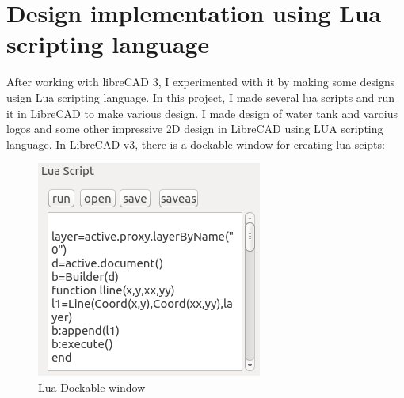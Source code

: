 \section{Design implementation using Lua scripting language}
After working with libreCAD 3, I experimented with it by making some designs usign Lua scripting language.
\noindent In this project, I made  several lua scripts and run it in LibreCAD to make various design. I made design of water tank and varoius logos and some other impressive 2D design in LibreCAD using LUA scripting language. 
In LibreCAD v3, there is a dockable window for creating lua scipts:
\begin{figure}[!ht]
\centering
\includegraphics[scale=0.5]{images/lualogo/lua.png}                   
\vspace{-1em}
\caption{Lua Dockable window }
\hspace{-1.5em}
\end{figure}
